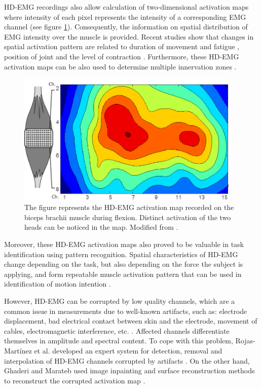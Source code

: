 HD-EMG recordings also allow calculation of two-dimensional activation maps where intensity of each pixel represents the intensity of a corresponding EMG channel (see figure \ref{fig:HD-EMG}). Consequently, the information on spatial distribution of EMG intensity over the muscle is provided. Recent studies show that changes in spatial activation pattern are related to duration of movement and fatigue \citep{Tucker2009, Staudenmann2014}, position of joint \citep{Vieira2010} and the level of contraction \citep{Holtermann2005}. Furthermore, these HD-EMG activation maps can be also used to determine multiple innervation zones \citep{Marateb2016}.
\begin{figure}[ht]
\centering
\includegraphics[width=0.95\textwidth]{Images/introduction/HD-EMG.png}
\caption{The figure represents the HD-EMG activation map recorded on the biceps brachii muscle during flexion. Distinct activation of the two heads can be noticed in the map. Modified from \citet{Monica-thesis}.}
\label{fig:HD-EMG}
\end{figure}

Moreover, these HD-EMG activation maps also proved to be valuable in task identification using pattern recognition. Spatial characteristics of HD-EMG change depending on the  task, but also depending on the force the subject is applying, and form repeatable muscle activation pattern that can be used in identification of motion intention \citep{Rojas-Martinez2012}.

However, HD-EMG can be corrupted by low quality channels, which are a common issue in measurements due to well-known artifacts, such as: electrode displacement, bad electrical contact between skin and the electrode, movement of cables, electromagnetic interference, etc. \citep{Clancy2002b}. Affected channels differentiate themselves in amplitude and spectral content. To cope with this problem, Rojas-Martínez et al. developed an expert system for detection, removal and interpolation of HD-EMG channels corrupted by artifacts \citep{Rojas-Martinez2012}. On the other hand, Ghaderi and Marateb used image inpainting and surface reconstruction methods to reconstruct the corrupted activation map \citep{Ghaderi2017}.


